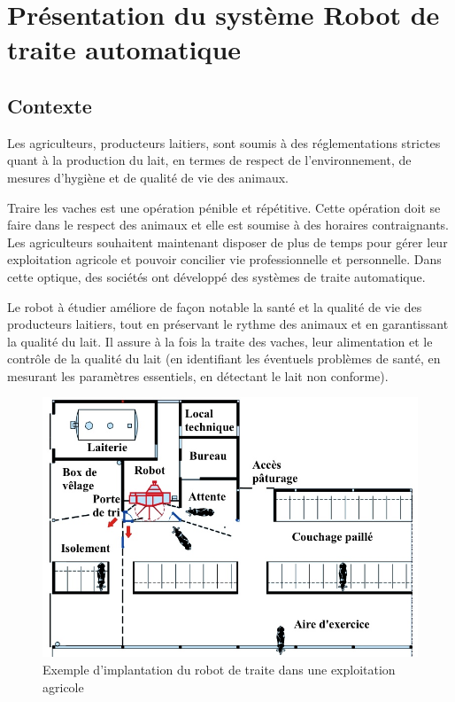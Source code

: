 

\section{Présentation du système \og Robot de traite automatique \fg}

\subsection{Contexte}

Les agriculteurs, producteurs laitiers, sont soumis à des réglementations strictes quant à la production du lait, en termes de respect de l’environnement, de mesures d’hygiène et de qualité de vie des animaux.

Traire les vaches est une opération pénible et répétitive. Cette opération doit se faire dans le respect des animaux et elle est soumise à des horaires contraignants. Les agriculteurs souhaitent maintenant disposer de plus de temps pour gérer leur exploitation agricole et pouvoir concilier vie professionnelle et personnelle. Dans cette optique, des sociétés ont développé des systèmes de traite automatique.

Le robot à étudier améliore de façon notable la santé et la qualité de vie des producteurs laitiers, tout en préservant le rythme des animaux et en garantissant la qualité du lait. Il assure à la fois la traite des vaches, leur alimentation et le contrôle de la qualité du lait (en identifiant les éventuels problèmes de santé, en mesurant les paramètres essentiels, en détectant le lait non conforme).

\begin{figure}[ht!]
\begin{center}
 \includegraphics[width=0.6\linewidth]{img/fig001}
\end{center}
\label{fig001}
\caption{Exemple d'implantation du robot de traite dans une exploitation agricole}
\end{figure}

